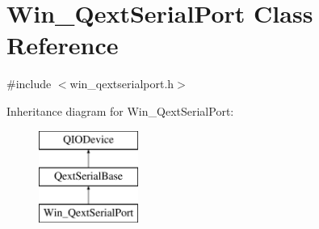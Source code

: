 \hypertarget{class_win___qext_serial_port}{}\section{Win\+\_\+\+Qext\+Serial\+Port Class Reference}
\label{class_win___qext_serial_port}


{\ttfamily \#include $<$win\+\_\+qextserialport.\+h$>$}

Inheritance diagram for Win\+\_\+\+Qext\+Serial\+Port\+:\begin{figure}[H]
\begin{center}
\leavevmode
\includegraphics[height=3.000000cm]{class_win___qext_serial_port}
\end{center}
\end{figure}
